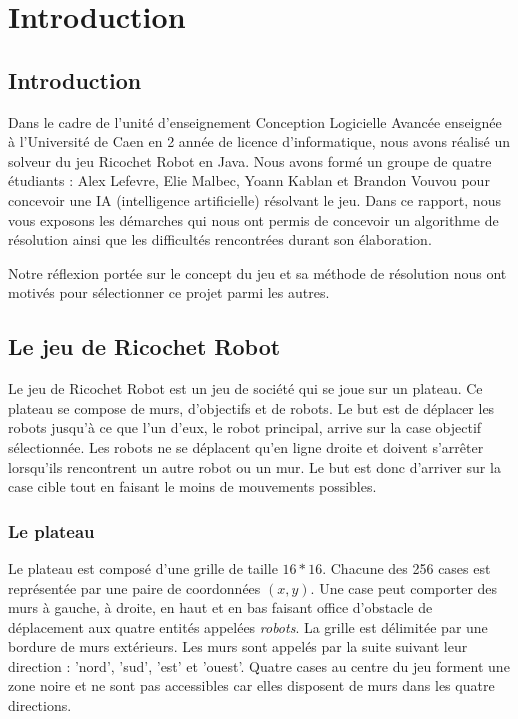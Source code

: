 \documentclass[a4paper]{article} %
\begin{document}
\section{Introduction}
	\subsection{Introduction}
Dans le cadre de l'unité d'enseignement Conception Logicielle Avancée enseignée à l'Université de Caen en 2 année de licence d'informatique, nous avons réalisé un solveur du jeu Ricochet Robot en Java. Nous avons formé un groupe de quatre étudiants : Alex Lefevre, Elie Malbec, Yoann Kablan et Brandon Vouvou pour concevoir une IA (intelligence artificielle) résolvant le jeu. Dans ce rapport, nous vous exposons les démarches qui nous ont permis de concevoir un algorithme de résolution ainsi que les difficultés rencontrées durant son élaboration.

Notre réflexion portée sur le concept du jeu et sa méthode de résolution nous ont motivés pour sélectionner ce projet parmi les autres.

	\subsection{Le jeu de Ricochet Robot}

Le jeu de Ricochet Robot est un jeu de société qui se joue sur un plateau. Ce plateau se compose de murs, d'objectifs et de robots. Le but est de déplacer les robots jusqu'à ce que l'un d'eux, le robot principal, arrive sur la case objectif sélectionnée. Les robots ne se déplacent qu'en ligne droite et doivent s'arrêter lorsqu'ils rencontrent un autre robot ou un mur. Le but est donc d'arriver sur la case cible tout en faisant le moins de mouvements possibles.

			\subsubsection{Le plateau}
Le plateau est composé d'une grille de taille $16*16$. Chacune des 256 cases est représentée par une paire de coordonnées $(x,y)$. Une case peut comporter des murs à gauche, à droite, en haut et en bas faisant office d'obstacle de déplacement aux quatre entités appelées \textit{robots}. La grille est délimitée par une bordure de murs extérieurs. Les murs sont appelés par la suite suivant leur direction : 'nord', 'sud', 'est' et 'ouest'. Quatre cases au centre du jeu forment une zone noire et ne sont pas accessibles car elles disposent de murs dans les quatre directions.
\end{document}
